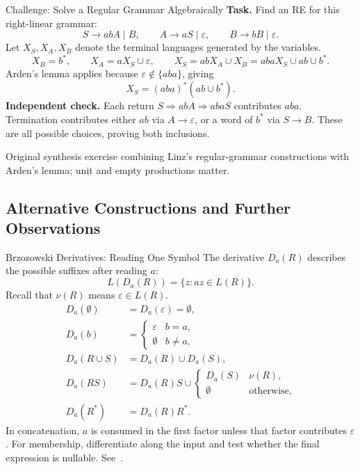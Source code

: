 \documentclass[10pt]{beamer}
\begin{document}
\begin{frame}{Challenge: Solve a Regular Grammar Algebraically}
  \small
  \textbf{Task.} Find an RE for this right-linear grammar:
  \[
    S\to abA\mid B,\qquad A\to aS\mid\varepsilon,\qquad
    B\to bB\mid\varepsilon.
  \]
  Let $X_S,X_A,X_B$ denote the terminal languages generated by the variables.
  \pause
  \[
    X_B=b^*,\qquad X_A=aX_S\cup\varepsilon,\qquad
    X_S=abX_A\cup X_B=abaX_S\cup ab\cup b^*.
  \]
  Arden's lemma applies because $\varepsilon\notin\{aba\}$, giving
  \[
    X_S=(aba)^*(ab\cup b^*).
  \]
  \pause
  \textbf{Independent check.} Each return
  $S\Rightarrow abA\Rightarrow abaS$ contributes $aba$. Termination
  contributes either $ab$ via $A\to\varepsilon$, or a word of $b^*$
  via $S\to B$. These are all possible choices, proving both inclusions.
  \par\smallskip
  {\scriptsize Original synthesis exercise combining Linz's regular-grammar
  constructions with Arden's lemma; unit and empty productions matter.}
\end{frame}

\subsection{Alternative Constructions and Further Observations}

\begin{frame}{Brzozowski Derivatives: Reading One Symbol}
  \small
  The derivative $D_a(R)$ describes the possible suffixes after reading $a$:
  \[
    L(D_a(R))=\{z:az\in L(R)\}.
  \]
  Recall that $\nu(R)$ means $\varepsilon\in L(R)$.
  \pause
  \[
    \begin{aligned}
      D_a(\emptyset)&=D_a(\varepsilon)=\emptyset,\\
      D_a(b)&=\begin{cases}\varepsilon&b=a,\\\emptyset&b\ne a,\end{cases}\\
      D_a(R\cup S)&=D_a(R)\cup D_a(S),\\
      D_a(RS)&=D_a(R)S\cup
        \begin{cases}D_a(S)&\nu(R),\\\emptyset&\text{otherwise},\end{cases}\\
      D_a(R^*)&=D_a(R)R^*.
    \end{aligned}
  \]
  \pause
  In concatenation, $a$ is consumed in the first factor unless that factor
  contributes $\varepsilon$. For membership, differentiate along the input
  and test whether the final expression is nullable. See~\cite{brzozowski}.
\end{frame}
\end{document}

